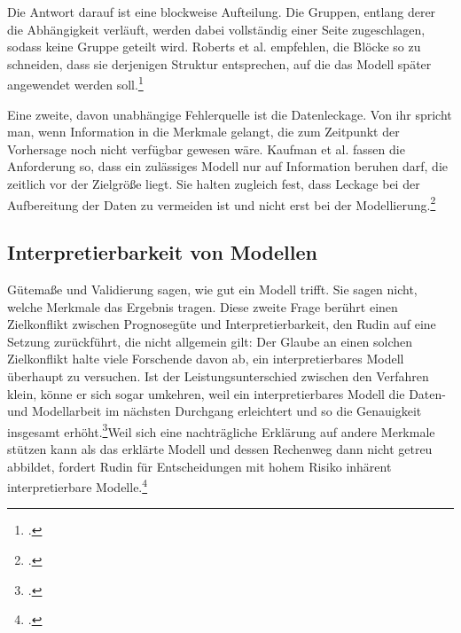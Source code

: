 \documentclass[12pt,a4paper]{article}
\begin{document}
Die Antwort darauf ist eine blockweise Aufteilung. Die Gruppen, entlang derer die Abhängigkeit
verläuft, werden dabei vollständig einer Seite zugeschlagen, sodass keine Gruppe geteilt wird. Roberts
et al. empfehlen, die Blöcke so zu schneiden, dass sie derjenigen Struktur entsprechen, auf die das
Modell später angewendet werden soll.\footcite[913, 925]{Roberts2017}

Eine zweite, davon unabhängige Fehlerquelle ist die Datenleckage. Von ihr spricht man, wenn
Information in die Merkmale gelangt, die zum Zeitpunkt der Vorhersage noch nicht verfügbar gewesen
wäre. Kaufman et al. fassen die Anforderung so, dass ein zulässiges Modell nur auf Information beruhen
darf, die zeitlich vor der Zielgröße liegt. Sie halten zugleich fest, dass Leckage bei der Aufbereitung
der Daten zu vermeiden ist und nicht erst bei der Modellierung.\footcite[559-560]{Kaufman2011}

\subsection{Interpretierbarkeit von Modellen}


Gütemaße und Validierung sagen, wie gut ein Modell trifft. Sie sagen nicht, welche Merkmale das
Ergebnis tragen. Diese zweite Frage berührt einen Zielkonflikt zwischen Prognosegüte und
Interpretierbarkeit, den Rudin auf eine Setzung zurückführt, die nicht allgemein gilt: Der Glaube an
einen solchen Zielkonflikt halte viele Forschende davon ab, ein interpretierbares Modell überhaupt zu
versuchen. Ist der Leistungsunterschied zwischen den Verfahren klein, könne er sich sogar umkehren,
weil ein interpretierbares Modell die Daten- und Modellarbeit im nächsten Durchgang erleichtert und
so die Genauigkeit insgesamt erhöht.\footcite[2-3]{Rudin2019}Weil sich eine nachträgliche Erklärung auf andere Merkmale stützen kann als das erklärte Modell und dessen Rechenweg dann nicht getreu abbildet, fordert Rudin für Entscheidungen mit hohem Risiko inhärent interpretierbare Modelle.\footcite[1, 4]{Rudin2019}
\end{document}
